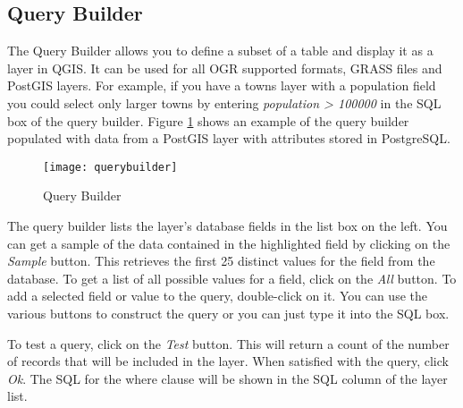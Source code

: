 \subsection{Query Builder}\label{sec:query_builder}

The Query Builder allows you to define a subset of a table and display
it as a layer in QGIS. It can be used for all OGR supported formats, GRASS 
files and PostGIS layers. For example, if you have a towns layer with a
population field you could select only larger towns by entering
\textsl{population > 100000} in the SQL box of the query builder. Figure
\ref{fig:query_builder} shows an example of the query builder populated with
data from a PostGIS layer with attributes stored in PostgreSQL. 

\begin{figure}[ht]
  \begin{center}
    \caption{Query Builder}\label{fig:query_builder}\smallskip
    \texttt{[image: querybuilder]}
  \end{center}  
\end{figure}

The query builder lists the layer's database
fields in the list box on the left. You can get a sample of the data
contained in the highlighted field by clicking on the \textit{Sample} button. This retrieves the first 25 distinct values
for the field from the database. To get a list of all possible values for a
field, click on the \textit{All} button. To add a selected field or value to the query, double-click on
it. You can use the various buttons to
construct the query or you can just type it into the SQL box.

To test a query, click on the \textit{Test} button. This will return a count of the number of records that will be
included in the layer. When satisfied with the query, click \textit{Ok}. The
SQL for the where clause will be shown in the SQL column of the layer list.

\begin{Tip}\caption{\textsc{Changing the Layer Definition}}
\end{Tip}

